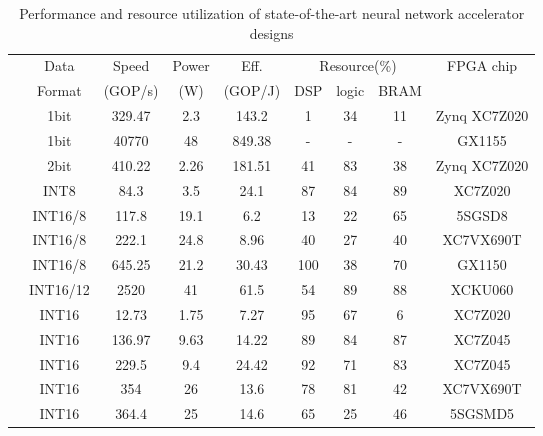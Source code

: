 \begin{table}[htbp]
    \centering
    \caption{Performance and resource utilization of state-of-the-art neural network accelerator designs}
    \begin{tabular}{r|c|c|c|c|ccc|c}
        \toprule
        \multicolumn{1}{c|}{} & Data  & Speed & Power & Eff. & \multicolumn{3}{c|}{Resource(\%)} & \multirow{2}[4]{*}{FPGA chip} \\ %
        \multicolumn{1}{c|}{} & Format & (GOP/s) & (W)   & (GOP/J) & DSP   & logic & BRAM  &  \\
        \hline
            \cite{nakahara2017fully}    & 1bit      & 329.47    & 2.3   & 143.2 & 1     & 34    & 11    & Zynq XC7Z020 \\ 
            \cite{moss2017high}         & 1bit      & 40770     & 48    & 849.38 &   -   &   -   &   -   & GX1155 \\ 
            \cite{jiao2017accelerating} & 2bit      & 410.22    & 2.26  & 181.51 & 41   & 83    & 38    & Zynq XC7Z020 \\ 
            \cite{guo2017angel}         & INT8      & 84.3      & 3.5   & 24.1  & 87    & 84    & 89    & XC7Z020 \\ 
            \cite{suda2016throughput}   & INT16/8   & 117.8     & 19.1  & 6.2   & 13    & 22    & 65    & 5SGSD8 \\ 
            \cite{liu2016automatic}     & INT16/8   & 222.1     & 24.8  & 8.96  & 40    & 27    & 40    & XC7VX690T \\ 
            \cite{ma2017optimizing}     & INT16/8   & 645.25    & 21.2  & 30.43 & 100   & 38    & 70    & GX1150 \\             
            \cite{han2017ese}           & INT16/12  & 2520      & 41    & 61.5  & 54    & 89    & 88    & XCKU060 \\ 
            \cite{venieris2017fpgaconvnet} & INT16  & 12.73     & 1.75  & 7.27  & 95    & 67    & 6     & XC7Z020 \\ 
            \cite{qiu2016going}         & INT16     & 136.97    & 9.63  & 14.22 & 89    & 84    & 87    & XC7Z045 \\ 
            \cite{xiao2017exploring}    & INT16     & 229.5     & 9.4   & 24.42 & 92    & 71    & 83    & XC7Z045 \\ 
            \cite{zhang2016caffeine}    & INT16     & 354       & 26    & 13.6  & 78    & 81    & 42    & XC7VX690T \\ 
            \cite{guan2017fp}           & INT16     & 364.4     & 25    & 14.6  & 65    & 25    & 46    & 5SGSMD5 \\ 

\end{tabular}
\end{table}
